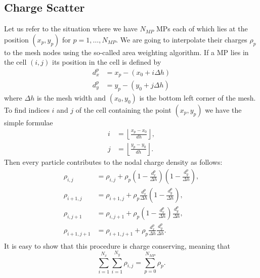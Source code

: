 \subsection{Charge Scatter}
\label{subsec:chargescatter}
Let us refer to the situation where we have $N_{MP}$ MPs each of which lies at the position $(x_{p}, y_{p})$ for $p = 1, \dots, N_{MP}$. We are going to interpolate their charges $\rho_p$ to the mesh nodes using the so-called area weighting algorithm. If a MP lies in the cell $(i, j)$ its position in the cell is defined by 
\begin{equation}\label{eq:dxdy}
    \begin{split}
        d^p_x &= x_p - (x_0 + i \Delta h)\\
        d^p_y &= y_p - (y_0 + j \Delta h)
    \end{split}
\end{equation}
where $\Delta h$ is the mesh width and $(x_0, y_0)$ is the bottom left corner of the mesh. To find indices $i$ and $j$ of the cell containing the point $(x_{p}, y_{p})$ we have the simple formulae
\begin{equation*}
    \begin{split}
        i &= \left\lfloor \frac{x_p - x_0}{dh} \right\rfloor,\\
        j &= \left\lfloor  \frac{y_p - y_0}{dh} \right\rfloor.
    \end{split}
\end{equation*}
Then every particle contributes to the nodal charge density as follows:
\begin{align*}
    \rho_{i, j} &= \rho_{i, j} + \rho_p \left(1 - \frac{d_x^p}{\Delta h}\right)\left(1 - \frac{d_y^p}{\Delta h}\right),\\
    \rho_{i + 1, j} &= \rho_{i + 1, j} + \rho_p \frac{d_x^p}{\Delta h}\left(1 - \frac{d_y^p}{\Delta h}\right),\\
    \rho_{i, j + 1} &= \rho_{i, j + 1} + \rho_p \left(1 - \frac{d_x^p}{\Delta h}\right)\frac{d_y^p}{\Delta h},\\
    \rho_{i + 1, j + 1} &= \rho_{i + 1, j + 1} + \rho_p \frac{d_x^p}{\Delta h} \frac{d_y^p}{\Delta h}.\\
\end{align*}
It is easy to show that this procedure is charge conserving, meaning that $$\sum_{i=1}^{N_x}\sum_{i=1}^{N_y} \rho_{i, j} = \sum_{p = 0}^{N_{MP}} \rho_p.$$

